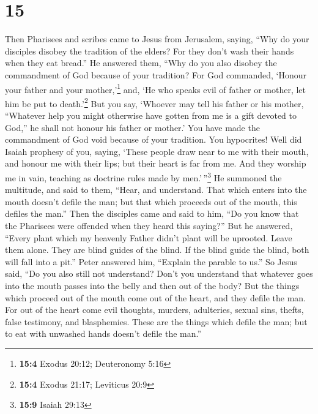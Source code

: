 \hypertarget{section-14}{%
\section{15}\label{section-14}}

 Then Pharisees and scribes came to Jesus from Jerusalem,
saying,  ``Why do your disciples disobey the tradition of
the elders? For they don't wash their hands when they eat bread.''
 He answered them, ``Why do you also disobey the
commandment of God because of your tradition?  For God
commanded, `Honour your father and your mother,'\footnote{\textbf{15:4}
  Exodus 20:12; Deuteronomy 5:16} and, `He who speaks evil of father or
mother, let him be put to death.'\footnote{\textbf{15:4} Exodus 21:17;
  Leviticus 20:9}  But you say, `Whoever may tell his
father or his mother, ``Whatever help you might otherwise have gotten
from me is a gift devoted to God,''  he shall not honour
his father or mother.' You have made the commandment of God void because
of your tradition.  You hypocrites! Well did Isaiah
prophesy of you, saying,  `These people draw near to me
with their mouth, and honour me with their lips; but their heart is far
from me.  And they worship me in vain, teaching as
doctrine rules made by men.'\,''\footnote{\textbf{15:9} Isaiah 29:13}
 He summoned the multitude, and said to them, ``Hear, and
understand.  That which enters into the mouth doesn't
defile the man; but that which proceeds out of the mouth, this defiles
the man.''  Then the disciples came and said to him, ``Do
you know that the Pharisees were offended when they heard this saying?''
 But he answered, ``Every plant which my heavenly Father
didn't plant will be uprooted.  Leave them alone. They
are blind guides of the blind. If the blind guide the blind, both will
fall into a pit.''  Peter answered him, ``Explain the
parable to us.''  So Jesus said, ``Do you also still not
understand?  Don't you understand that whatever goes into
the mouth passes into the belly and then out of the body?
 But the things which proceed out of the mouth come out
of the heart, and they defile the man.  For out of the
heart come evil thoughts, murders, adulteries, sexual sins, thefts,
false testimony, and blasphemies.  These are the things
which defile the man; but to eat with unwashed hands doesn't defile the
man.''

